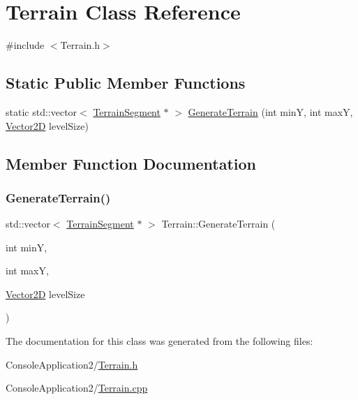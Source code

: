 \hypertarget{class_terrain}{}\section{Terrain Class Reference}
\label{class_terrain}


{\ttfamily \#include $<$Terrain.\+h$>$}

\subsection*{Static Public Member Functions}
\begin{DoxyCompactItemize}
\item 
static std\+::vector$<$ \hyperlink{class_terrain_segment}{Terrain\+Segment} $\ast$ $>$ \hyperlink{class_terrain_a42a56b23bc25a78d083b8dc3d8da765e}{Generate\+Terrain} (int minY, int maxY, \hyperlink{class_vector2_d}{Vector2D} level\+Size)
\end{DoxyCompactItemize}


\subsection{Member Function Documentation}
\hypertarget{class_terrain_a42a56b23bc25a78d083b8dc3d8da765e}{}\label{class_terrain_a42a56b23bc25a78d083b8dc3d8da765e} 
\subsubsection{\texorpdfstring{Generate\+Terrain()}{GenerateTerrain()}}
{\footnotesize\ttfamily std\+::vector$<$ \hyperlink{class_terrain_segment}{Terrain\+Segment} $\ast$ $>$ Terrain\+::\+Generate\+Terrain (\begin{DoxyParamCaption}\item[{int}]{minY,  }\item[{int}]{maxY,  }\item[{\hyperlink{class_vector2_d}{Vector2D}}]{level\+Size }\end{DoxyParamCaption})\hspace{0.3cm}{\ttfamily [static]}}



The documentation for this class was generated from the following files\+:\begin{DoxyCompactItemize}
\item 
Console\+Application2/\hyperlink{_terrain_8h}{Terrain.\+h}\item 
Console\+Application2/\hyperlink{_terrain_8cpp}{Terrain.\+cpp}\end{DoxyCompactItemize}
